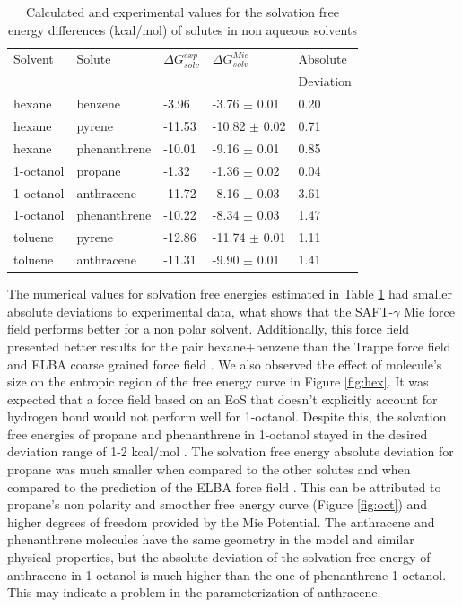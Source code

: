 \begin{table}[h]
\centering
  \caption{Calculated and experimental values for the solvation free energy differences (kcal/mol) of solutes in non aqueous solvents}
  \label{tbl:solv1}
  \begin{tabular}{lllll}
    \hline
      Solvent & Solute & $\Delta G_{solv}^{exp}$&  $\Delta G_{solv}^{Mie}$ & Absolute \\
      & & & & Deviation \\
    \hline
    hexane    & benzene      & -3.96  & -3.76  $\pm$ 0.01 & 0.20 \\
    hexane    & pyrene       & -11.53& -10.82 $\pm$ 0.02 & 0.71 \\
    hexane    & phenanthrene & -10.01& -9.16  $\pm$ 0.01 & 0.85 \\
    1-octanol & propane      & -1.32  & -1.36  $\pm$ 0.02 & 0.04 \\
    1-octanol & anthracene   & -11.72&  -8.16  $\pm$ 0.03 & 3.61 \\
    1-octanol & phenanthrene & -10.22&  -8.34  $\pm$ 0.03 & 1.47 \\
    toluene   & pyrene       & -12.86&  -11.74 $\pm$ 0.01 & 1.11\\
    toluene   & anthracene   & -11.31&  -9.90 $\pm$ 0.01 & 1.41\\
    \hline
  \end{tabular}
\end{table}
\FloatBarrier

The numerical values for solvation free energies estimated in Table \ref{tbl:solv1} had smaller absolute deviations to experimental data, what shows that the SAFT-$\gamma$ Mie force field performs better for a non polar solvent. Additionally, this force field presented better results for the pair hexane+benzene than the Trappe force field \cite{garrido2011} and ELBA coarse grained force field \cite{doi:10.1021/acs.jctc.5b00963}. We also observed the effect of molecule's size on the entropic region of the free energy curve in Figure \ref{fig:hex}. It was expected that a force field based on an EoS that doesn't explicitly account for hydrogen bond would not perform well for 1-octanol. Despite this, the solvation free energies of propane and phenanthrene in 1-octanol stayed in the desired deviation range of 1-2 kcal/mol \cite{doimobley}. The solvation free energy absolute deviation for propane was much smaller when compared to the other solutes and when compared to the prediction of the ELBA force field \cite{doi:10.1021/acs.jctc.5b00963}. This can be attributed to propane's non polarity and smoother free energy curve (Figure \ref{fig:oct}) and higher degrees of freedom provided by the Mie Potential. The anthracene and phenanthrene molecules have the same geometry in the model and similar physical properties, but the absolute deviation of the solvation free energy of anthracene in 1-octanol is much higher than the one of phenanthrene 1-octanol. This may indicate a problem in the parameterization of anthracene.     


